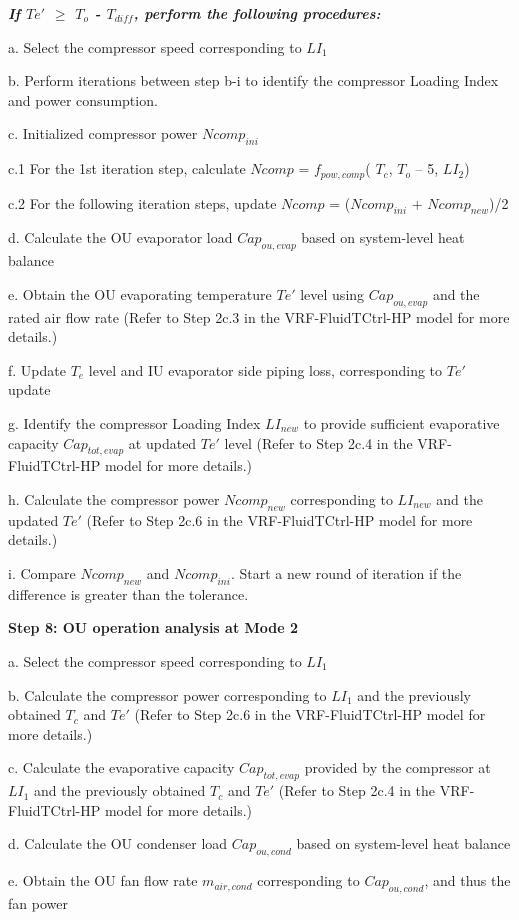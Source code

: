 \emph{\textbf{If $Te'$ $\geq$  $T_o$ - $T_{diff}$, perform the following procedures:}}

a. Select the compressor speed corresponding to $LI_1$

b. Perform iterations between step b-i to identify the compressor Loading Index and power consumption.

c. Initialized compressor power $Ncomp_{ini}$

c.1 For the 1st iteration step, calculate $Ncomp$ = $f_{pow,comp}$( $T_c$, $T_o$ – 5, $LI_2$)

c.2 For the following iteration steps, update $Ncomp$ = ($Ncomp_{ini}$ + $Ncomp_{new}$)/2

d. Calculate the OU evaporator load $Cap_{ou,evap}$ based on system-level heat balance

e. Obtain the OU evaporating temperature $Te'$ level using $Cap_{ou,evap}$ and the rated air flow rate
(Refer to Step 2c.3 in the VRF-FluidTCtrl-HP model for more details.)

f. Update $T_e$ level and IU evaporator side piping loss, corresponding to $Te'$ update

g. Identify the compressor Loading Index $LI_{new}$ to provide sufficient evaporative capacity $Cap_{tot,evap}$ at updated $Te'$ level
(Refer to Step 2c.4 in the VRF-FluidTCtrl-HP model for more details.)

h. Calculate the compressor power $Ncomp_{new}$ corresponding to $LI_{new}$ and the updated $Te'$
(Refer to Step 2c.6 in the VRF-FluidTCtrl-HP model for more details.)

i. Compare $Ncomp_{new}$ and $Ncomp_{ini}$. Start a new round of iteration if the difference is greater than the tolerance.

\textbf{Step 8: OU operation analysis at Mode 2}

a. Select the compressor speed corresponding to $LI_1$

b. Calculate the compressor power corresponding to $LI_1$ and the previously obtained $T_c$ and $Te'$
(Refer to Step 2c.6 in the VRF-FluidTCtrl-HP model for more details.)

c. Calculate the evaporative capacity $Cap_{tot,evap}$ provided by the compressor at $LI_1$ and the previously obtained $T_c$ and $Te'$
(Refer to Step 2c.4 in the VRF-FluidTCtrl-HP model for more details.)

d. Calculate the OU condenser load $Cap_{ou,cond}$ based on system-level heat balance

e. Obtain the OU fan flow rate $m_{air,cond}$ corresponding to $Cap_{ou,cond}$, and thus the fan power

